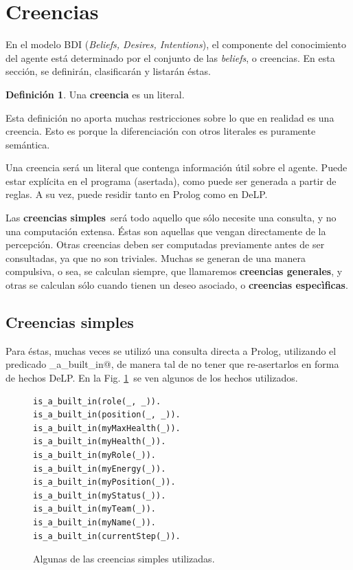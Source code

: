 \documentclass[oneside]{book}
\theoremstyle{definition}
\newtheorem{definicion}{Definición}[section]
\theoremstyle{example}
\begin{document}
\section{Creencias}

\label{sec:creencias}

En el modelo BDI (\textit{Beliefs, Desires, Intentions}), el componente del conocimiento
del agente está determinado por el conjunto de las \textit{beliefs}, o creencias. En esta
sección, se definirán, clasificarán y listarán éstas.

\begin{definicion}
	Una \textbf{creencia} es un literal.
\end{definicion}

Esta definición no aporta muchas restricciones sobre lo que en realidad es una creencia.
Esto es porque la diferenciación con otros literales es puramente semántica.

Una creencia será un literal que contenga información útil sobre el agente. Puede estar
explícita en el programa (asertada), como puede ser generada a partir de reglas. A su vez,
puede residir tanto en Prolog como en DeLP.

Las \textbf{creencias simples}\ será todo aquello que sólo necesite una consulta, y no
una computación extensa. Éstas son aquellas que vengan directamente de la percepción. 
Otras creencias deben ser computadas previamente antes de ser consultadas, ya que no
son triviales. Muchas se generan de una manera compulsiva, o sea, se calculan siempre,
que llamaremos \textbf{creencias generales},
y otras se calculan sólo cuando tienen un deseo asociado, o \textbf{creencias 
especìficas}.


\subsection{Creencias simples}


Para éstas, muchas veces se utilizó una consulta directa a Prolog,
utilizando el predicado \verb@is_a_built_in@, de manera tal de no tener que 
re-asertarlos en forma de hechos DeLP. En la Fig. \ref{fig:creenciasSimples}\ se ven
algunos de los hechos utilizados.

\begin{figure}
\begin{verbatim}
is_a_built_in(role(_, _)).
is_a_built_in(position(_, _)).
is_a_built_in(myMaxHealth(_)).
is_a_built_in(myHealth(_)).
is_a_built_in(myRole(_)).
is_a_built_in(myEnergy(_)).
is_a_built_in(myPosition(_)).
is_a_built_in(myStatus(_)).
is_a_built_in(myTeam(_)).
is_a_built_in(myName(_)).
is_a_built_in(currentStep(_)).
\end{verbatim}
\caption{Algunas de las creencias simples utilizadas.}
\label{fig:creenciasSimples}
\end{figure}
\end{document}
